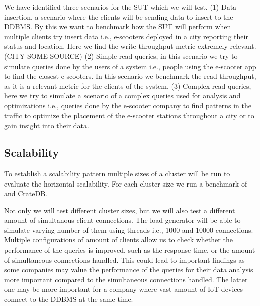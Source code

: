 We have identified three scenarios for the SUT which we will test.
(1) Data insertion, a scenario where the clients will be sending data to insert to the DDBMS.
By this we want to benchmark how the SUT will perform when multiple clients try insert data i.e., e-scooters deployed in a city reporting their status and location.
Here we find the write throughput metric extremely relevant. (CITY SOME SOURCE)
(2) Simple read queries, in this scenario we try to simulate queries done by the users of a system i.e., people using the e-scooter app to find the closest e-scooters.
In this scenario we benchmark the read throughput, as it is a relevant metric for the clients of the system.
(3) Complex read queries, here we try to simulate a scenario of a complex queries used for analysis and optimizations i.e., queries done by the e-scooter company to find patterns in the traffic to optimize the placement of the e-scooter stations throughout a city or to gain insight into their data.

\subsection{Scalability}
To establish a scalability pattern multiple sizes of a cluster will be run to evaluate the horizontal scalability.
For each cluster size we run a benchmark of \mobilitydbc and CrateDB.

Not only we will test different cluster sizes, but we will also test a different amount of simultanous client connections.
The load generator will be able to simulate varying number of them using threads i.e., 1000 and 10000 connections.
Multiple configurations of amount of clients allow us to check whether the performance of the queries is improved, such as the response time, or the amount of simultaneous connections handled.
This could lead to important findings as some companies may value the performance of the queries for their data analysis more important compared to the simultaneous connections handled.
The latter one may be more important for a company where vast amount of IoT devices connect to the DDBMS at the same time.

